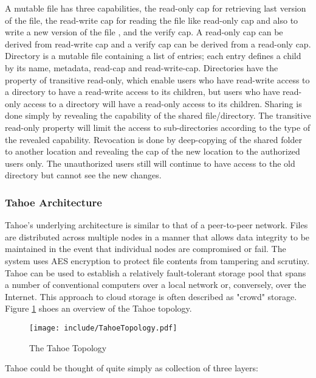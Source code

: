 \documentclass[11pt]{article}
\begin{document}
A mutable file has three capabilities, the read-only cap for retrieving 
last version of the file, the read-write cap for reading the file like 
read-only cap and also to write a new version of the file , and the 
verify cap. A read-only cap can be derived from read-write cap and a 
verify cap can be derived from a read-only cap. Directory is a mutable 
file containing a list of entries; each entry defines a child by its name, 
metadata, read-cap and read-write-cap. Directories have the property of 
transitive read-only, which enable users who have read-write access to a 
directory to have a read-write access to its children, but users who have 
read-only access to a directory will have a read-only access to its 
children. Sharing is done simply by revealing the capability of the shared 
file/directory. The transitive read-only property will limit the access to 
sub-directories according to the type of the revealed capability. 
Revocation is done by deep-copying  of the shared folder to another 
location and revealing the cap of the new location to the authorized users 
only. The unauthorized users still will continue to have access to the 
old directory but cannot see the new changes.

\subsubsection{Tahoe Architecture}
Tahoe's underlying architecture is similar to that of a peer-to-peer 
network. Files are distributed across multiple nodes in a manner that 
allows data integrity to be maintained in the event that individual nodes 
are compromised or fail. The system uses AES encryption to protect file 
contents from tampering and scrutiny. Tahoe can be used to establish a 
relatively fault-tolerant storage pool that spans a number of conventional 
computers over a local network or, conversely, over the Internet. This 
approach to cloud storage is often described as "crowd"
storage. Figure \ref{fig:TahoeTopology} shoes an overview of the Tahoe
topology.

\begin{figure}[htbp]
  \centering
  \texttt{[image: include/TahoeTopology.pdf]}
  \caption{The Tahoe Topology}
  \label{fig:TahoeTopology}
\end{figure}

Tahoe could be thought of quite simply as collection of three layers: 
\end{document}
